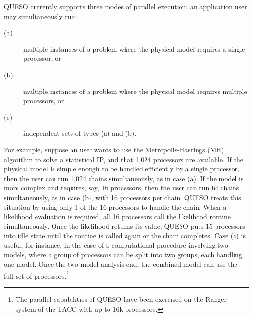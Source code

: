 QUESO currently supports three modes of parallel execution:
an application user may simultaneously run:
\begin{description}
\item[(a)] multiple instances of a problem where the physical model requires a single processor, or
\item[(b)] multiple instances of a problem where the physical model requires multiple processors, or
\item[(c)] independent sets of types (a) and (b).
\end{description}

For example, suppose an user wants to use the Metropolis-Hastings (MH) algorithm to solve a statistical IP, and that 1,024 processors are available.
If the physical model is simple enough to be handled efficiently by a single processor, then the user can run 1,024 chains simultaneously, as in case (a).
If the model is more complex and requires, say, 16 processors, then the user can run 64 chains simultaneously, as in case (b), with 16 processors per chain.
QUESO treats this situation by using only 1 of the 16 processors to handle the chain.
When a likelihood evaluation is required, all 16 processors call the likelihood routine simultaneously.
Once the likelihood returns its value, QUESO puts  15 processors into idle state until the routine is called again or the chain completes.
Case (c) is useful, for instance, in the case of a computational procedure involving two models,
where a group of processors can be split into two groups, each handling one model.
Once the two-model analysis end, the combined model can use the full set of processors.\footnote{The parallel capabilities of QUESO have been exercised on the Ranger system of the TACC \cite{tacc} with up to 16k processors.}


